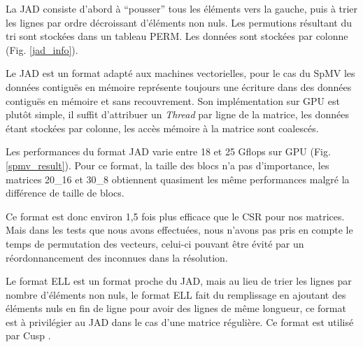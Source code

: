 \documentclass[renpar]{compas2013}
\begin{document}
    La JAD \cite{LiSa10GAPILS} consiste d'abord à ``pousser'' tous les éléments vers la gauche,
    puis à trier les lignes par ordre décroissant d'éléments non nuls. Les permutions résultant
    du tri sont stockées dans un tableau PERM.
    Les données sont stockées par colonne (Fig. \ref{jad_info}).
    
    Le JAD est un format adapté aux machines vectorielles, pour le cas du SpMV les
    données contiguës en mémoire représente toujours une écriture dans des données
    contiguës en mémoire et sans recouvrement. Son implémentation sur GPU est plutôt
    simple, il suffit d'attribuer un \textit{Thread} par ligne de la matrice, les données étant
    stockées par colonne, les accès mémoire à la matrice sont coalescés.
    
    
    Les performances du format JAD varie entre 18 et 25 Gflops sur GPU (Fig. \ref{spmv_result}).
    Pour ce format, la taille des blocs n'a pas d'importance, les matrices 20\_16 
    et 30\_8 obtiennent quasiment les même performances malgré la différence de taille de blocs.
    
    Ce format est donc environ 1,5 fois plus efficace que le CSR pour nos matrices.
    Mais dans les tests que nous avons
    effectuées, nous n'avons pas pris en compte le temps de permutation des vecteurs, celui-ci
    pouvant être évité par un réordonnancement des inconnues dans la résolution.

    Le format ELL \cite{VOFG10Improving} est un format proche du JAD, mais au lieu de trier les lignes
    par nombre d'éléments non nuls, le format ELL fait du remplissage en ajoutant des éléments nuls en fin
    de ligne pour avoir des lignes de même longueur, ce format est à privilégier au JAD dans le cas d'une
    matrice régulière. Ce format est utilisé par Cusp \cite{Cusp}.


\end{document}
